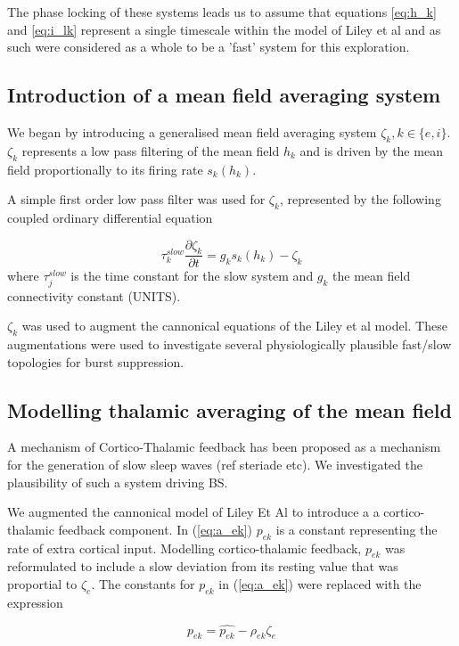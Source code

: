 \documentclass[a4paper,12pt]{article}
\begin{document}
The phase locking of these systems leads us to assume that equations \ref{eq:h_k} and \ref{eq:i_lk} represent a single
timescale within the model of Liley et al and as such were considered as a whole to be a 'fast' system for this
exploration.

\subsection{Introduction of a mean field averaging system}

We began by introducing a generalised mean field averaging system $\zeta_{k}, k \in \{e, i\}$.  $\zeta_{k}$ represents a low pass filtering of the mean field $h_k$ and is driven by the mean field proportionally to its firing rate $s_{k}(h_{k})$.

A simple first order low pass filter was used for $\zeta_k$, represented by the following coupled ordinary differential equation

\begin{equation} \label{eq:zeta_slow} 
\tau_k^{slow} \frac{\partial \zeta_k}{\partial t} = g_k s_k(h_k) - \zeta_k
\end{equation}
where $\tau_j^{slow}$ is the time constant for the slow system and $g_k$ the mean field connectivity
constant (UNITS).

$\zeta_{k}$ was used to augment the cannonical equations of the Liley et al model. These augmentations were used to investigate several physiologically plausible fast/slow topologies for burst suppression.

\subsection{Modelling thalamic averaging of the mean field}
A mechanism of Cortico-Thalamic feedback has been proposed as a mechanism for the generation of slow sleep waves (ref steriade etc). 
We investigated the plausibility of such a system driving BS. 

We augmented the cannonical model of Liley Et Al to introduce a a cortico-thalamic feedback component. 
In (\ref{eq:a_ek}) $p_{ek}$ is a constant representing the rate of extra cortical input. Modelling cortico-thalamic feedback, $p_{ek}$ was reformulated to include a slow deviation from its resting value that was proportial to $\zeta_e$. The constants for $p_{ek}$ in (\ref{eq:a_ek}) were replaced with the expression

\begin{equation} \label{eq:p_ek}
p_{ek} = \hat{p_{ek}} - \rho_{ek} \zeta_e
\end{equation}
\end{document}
